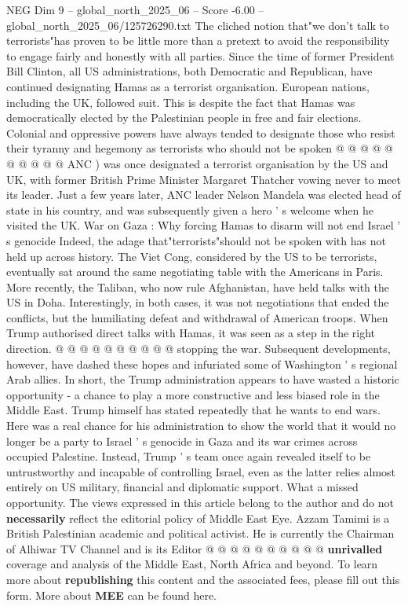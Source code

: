 \begin{textsample}{NEG Dim 9 – global\_north\_2025\_06 – Score -6.00 – global\_north\_2025\_06/125726290.txt}
The cliched notion that"we don't talk to terrorists"has proven to be little more than a pretext to avoid the responsibility to engage fairly and honestly with all parties.
Since the time of former President Bill Clinton, all US administrations, both Democratic and Republican, have continued designating Hamas as a terrorist organisation.
European nations, including the UK, followed suit.
This is despite the fact that Hamas was democratically elected by the Palestinian people in free and fair elections.
Colonial and oppressive powers have always tended to designate those who resist their tyranny and hegemony as terrorists who should not be spoken @ @ @ @ @ @ @ @ @ @ ANC ) was once designated a terrorist organisation by the US and UK, with former British Prime Minister Margaret Thatcher vowing never to meet its leader.
Just a few years later, ANC leader Nelson Mandela was elected head of state in his country, and was subsequently given a hero ' s welcome when he visited the UK.
War on Gaza : Why forcing Hamas to disarm will not end Israel ' s genocide Indeed, the adage that"terrorists"should not be spoken with has not held up across history.
The Viet Cong, considered by the US to be terrorists, eventually sat around the same negotiating table with the Americans in Paris.
More recently, the Taliban, who now rule Afghanistan, have held talks with the US in Doha.
Interestingly, in both cases, it was not negotiations that ended the conflicts, but the humiliating defeat and withdrawal of American troops.
When Trump authorised direct talks with Hamas, it was seen as a step in the right direction. @ @ @ @ @ @ @ @ @ @ stopping the war.
Subsequent developments, however, have dashed these hopes and infuriated some of Washington ' s regional Arab allies.
In short, the Trump administration appears to have wasted a historic opportunity - a chance to play a more constructive and less biased role in the Middle East.
Trump himself has stated repeatedly that he wants to end wars.
Here was a real chance for his administration to show the world that it would no longer be a party to Israel ' s genocide in Gaza and its war crimes across occupied Palestine.
Instead, Trump ' s team once again revealed itself to be untrustworthy and incapable of controlling Israel, even as the latter relies almost entirely on US military, financial and diplomatic support.
What a missed opportunity.
The views expressed in this article belong to the author and do not \textbf{necessarily} reflect the editorial policy of Middle East Eye.
Azzam Tamimi is a British Palestinian academic and political activist.
He is currently the Chairman of Alhiwar TV Channel and is its Editor @ @ @ @ @ @ @ @ @ @ \textbf{unrivalled} coverage and analysis of the Middle East, North Africa and beyond.
To learn more about \textbf{republishing} this content and the associated fees, please fill out this form.
More about \textbf{MEE} can be found here.

\end{textsample}

